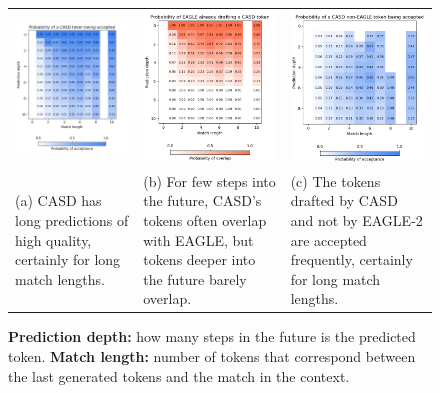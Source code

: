 \begin{landscape}

\begin{figure}
  \centering
  \captionsetup{width=0.55\linewidth}
  \begin{tabular}{@{}l@{}@{}l@{}@{}l@{}}
    \includegraphics[width=.33\linewidth]{fig/prob_casd_accept.png} & \includegraphics[width=.33\linewidth]{fig/prob_casd_eagle_overlap.png} & \includegraphics[width=.30\linewidth, height=.371\linewidth]{fig/prob_casd_non_eagle_accept.png} \\[0.5cm]
    \hspace{0.5cm} \parbox{.27\linewidth}{\small (a) CASD has long predictions of high quality, certainly for long match lengths. \newline} 
    & \hspace{0.5cm} \parbox{.27\linewidth}{\small (b) For few steps into the future, CASD's tokens often overlap with EAGLE, but tokens deeper into the future barely overlap.}
    & \hspace{0.5cm} \parbox{.27\linewidth}{\small (c) The tokens drafted by CASD and not by EAGLE-2 are accepted frequently, certainly for long match lengths.} 
  \end{tabular}
  \vspace{0.2cm}
  \caption{
    \textbf{Prediction depth:} how many steps in the future is the predicted token.
    \textbf{Match length:} number of tokens that correspond between the last generated tokens and the match in the context. \\
  }
  \label{fig:prob_casd_accept}
  \label{fig:prob_casd_eagle_overlap}
\end{figure}

\end{landscape}